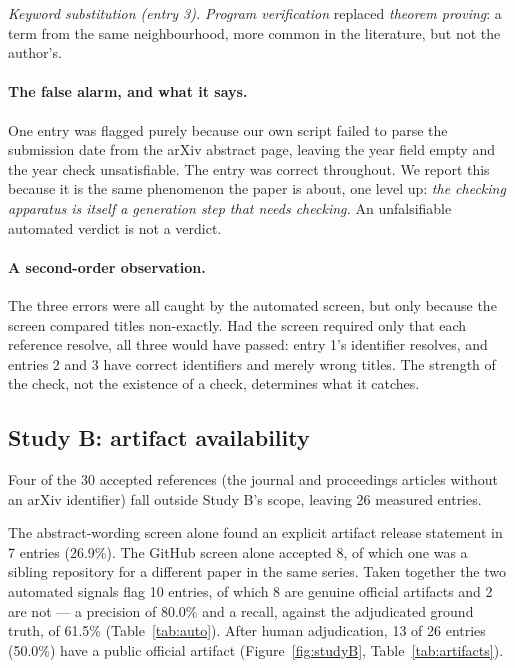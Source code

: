 \documentclass[11pt,a4paper]{article}
\begin{document}
\emph{Keyword substitution (entry 3).} \emph{Program verification} replaced
\emph{theorem proving}: a term from the same neighbourhood, more common in the
literature, but not the author's.

\paragraph{The false alarm, and what it says.} One entry was flagged purely
because our own script failed to parse the submission date from the arXiv
abstract page, leaving the year field empty and the year check unsatisfiable.
The entry was correct throughout. We report this because it is the same
phenomenon the paper is about, one level up: \emph{the checking apparatus is
itself a generation step that needs checking.} An unfalsifiable automated
verdict is not a verdict.

\paragraph{A second-order observation.} The three errors were all caught by the
automated screen, but only because the screen compared titles non-exactly. Had
the screen required only that each reference resolve, all three would have
passed: entry 1's identifier resolves, and entries 2 and 3 have correct
identifiers and merely wrong titles. The strength of the check, not the
existence of a check, determines what it catches.

\subsection{Study B: artifact availability}
\label{sec:studyB}

Four of the 30 accepted references (the journal and proceedings articles
without an arXiv identifier) fall outside Study B's scope, leaving 26 measured
entries.

The abstract-wording screen alone found an explicit artifact release statement
in 7 entries (26.9\%). The GitHub screen alone accepted 8, of which one was a
sibling repository for a different paper in the same series. Taken together the
two automated signals flag 10 entries, of which 8 are genuine official
artifacts and 2 are not --- a precision of 80.0\% and a recall, against the
adjudicated ground truth, of 61.5\% (Table~\ref{tab:auto}). After human
adjudication, 13 of 26 entries (50.0\%) have a public official artifact
(Figure~\ref{fig:studyB}, Table~\ref{tab:artifacts}).
\end{document}
